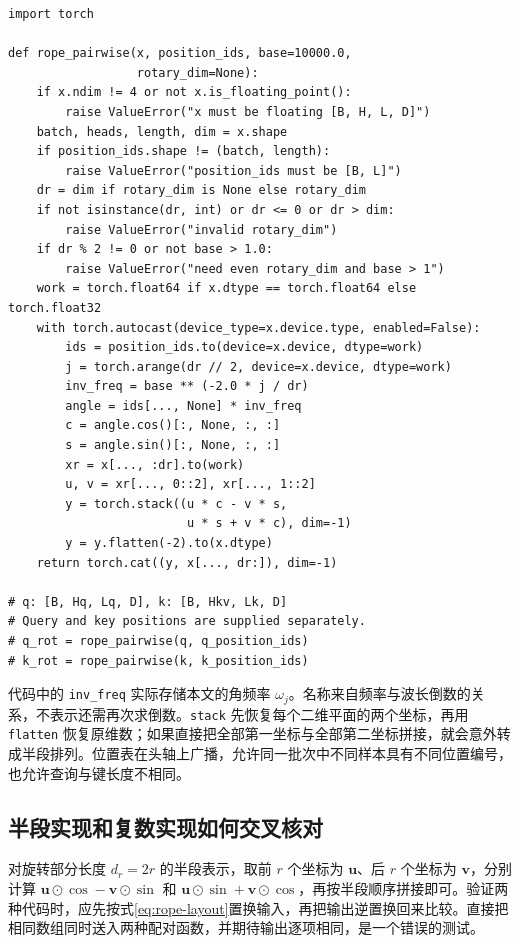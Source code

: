 \documentclass[UTF8,12pt,a4paper,fontset=fandol]{ctexart}
\begin{document}
\begin{verbatim}
import torch

def rope_pairwise(x, position_ids, base=10000.0,
                  rotary_dim=None):
    if x.ndim != 4 or not x.is_floating_point():
        raise ValueError("x must be floating [B, H, L, D]")
    batch, heads, length, dim = x.shape
    if position_ids.shape != (batch, length):
        raise ValueError("position_ids must be [B, L]")
    dr = dim if rotary_dim is None else rotary_dim
    if not isinstance(dr, int) or dr <= 0 or dr > dim:
        raise ValueError("invalid rotary_dim")
    if dr % 2 != 0 or not base > 1.0:
        raise ValueError("need even rotary_dim and base > 1")
    work = torch.float64 if x.dtype == torch.float64 else torch.float32
    with torch.autocast(device_type=x.device.type, enabled=False):
        ids = position_ids.to(device=x.device, dtype=work)
        j = torch.arange(dr // 2, device=x.device, dtype=work)
        inv_freq = base ** (-2.0 * j / dr)
        angle = ids[..., None] * inv_freq
        c = angle.cos()[:, None, :, :]
        s = angle.sin()[:, None, :, :]
        xr = x[..., :dr].to(work)
        u, v = xr[..., 0::2], xr[..., 1::2]
        y = torch.stack((u * c - v * s,
                         u * s + v * c), dim=-1)
        y = y.flatten(-2).to(x.dtype)
    return torch.cat((y, x[..., dr:]), dim=-1)

# q: [B, Hq, Lq, D], k: [B, Hkv, Lk, D]
# Query and key positions are supplied separately.
# q_rot = rope_pairwise(q, q_position_ids)
# k_rot = rope_pairwise(k, k_position_ids)
\end{verbatim}

代码中的 \texttt{inv\_freq} 实际存储本文的角频率 $\omega_j$。名称来自频率与波长倒数的关系，不表示还需再次求倒数。\texttt{stack} 先恢复每个二维平面的两个坐标，再用 \texttt{flatten} 恢复原维数；如果直接把全部第一坐标与全部第二坐标拼接，就会意外转成半段排列。位置表在头轴上广播，允许同一批次中不同样本具有不同位置编号，也允许查询与键长度不相同。

\subsection{半段实现和复数实现如何交叉核对}
对旋转部分长度 $d_r=2r$ 的半段表示，取前 $r$ 个坐标为 $\mathbf u$、后 $r$ 个坐标为 $\mathbf v$，分别计算 $\mathbf u\odot\cos-\mathbf v\odot\sin$ 和 $\mathbf u\odot\sin+\mathbf v\odot\cos$，再按半段顺序拼接即可。验证两种代码时，应先按式\eqref{eq:rope-layout}置换输入，再把输出逆置换回来比较。直接把相同数组同时送入两种配对函数，并期待输出逐项相同，是一个错误的测试。
\end{document}
